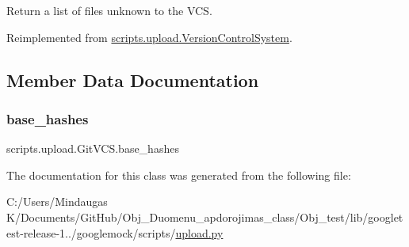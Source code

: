 \begin{DoxyVerb}Return a list of files unknown to the VCS.\end{DoxyVerb}
 

Reimplemented from \mbox{\hyperlink{classscripts_1_1upload_1_1_version_control_system_a622bbb4e8be9c1cdfde8aa1af1f7f553}{scripts.\+upload.\+Version\+Control\+System}}.



\subsection{Member Data Documentation}
\mbox{\label{classscripts_1_1upload_1_1_git_v_c_s_ad3287cfe3e70a11ead043def0c2b8a06}} 
\subsubsection{\texorpdfstring{base\_hashes}{base\_hashes}}
{\footnotesize\ttfamily scripts.\+upload.\+Git\+V\+C\+S.\+base\+\_\+hashes}



The documentation for this class was generated from the following file\+:\begin{DoxyCompactItemize}
\item 
C\+:/\+Users/\+Mindaugas K/\+Documents/\+Git\+Hub/\+Obj\+\_\+\+Duomenu\+\_\+apdorojimas\+\_\+class/\+Obj\+\_\+test/lib/googletest-\/release-\/1../googlemock/scripts/\mbox{\hyperlink{_obj__test_2lib_2googletest-release-1_88_81_2googlemock_2scripts_2upload_8py}{upload.\+py}}\end{DoxyCompactItemize}
